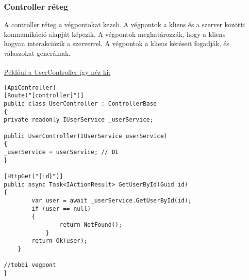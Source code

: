 \subsubsection*{Controller réteg}
A controller réteg a végpontokat kezeli. A végpontok a kliens és a szerver közötti kommunikáció alapját képezik. A végpontok meghatározzák, hogy a kliens hogyan interakciózik a szerverrel. A végpontok a kliens kéréseit fogadják, és válaszokat generálnak.
\\
\\
\underline{Például a UserController így néz ki:}
\begin{lstlisting}[language=CSharp,style=CSharpBase,caption={User Controller}]
[ApiController]
[Route("[controller]")]
public class UserController : ControllerBase
{
private readonly IUserService _userService;

public UserController(IUserService userService)
{
_userService = userService; // DI
}

[HttpGet("{id}")]
public async Task<IActionResult> GetUserById(Guid id)
{
        var user = await _userService.GetUserById(id);
        if (user == null)
        {
                return NotFound();
            }
        return Ok(user);
    }

//tobbi vegpont
}
\end{lstlisting}
